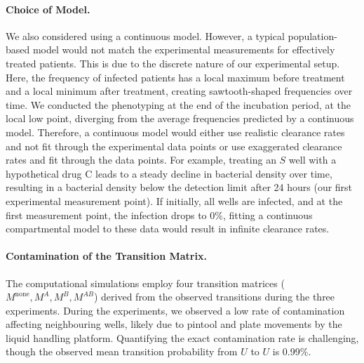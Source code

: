 \paragraph{Choice of Model.}
We also considered using a continuous model.
However, a typical population-based model would not match the experimental measurements for effectively treated patients.
This is due to the discrete nature of our experimental setup.
Here, the frequency of infected patients has a local maximum before treatment and a local minimum after treatment, creating sawtooth-shaped frequencies over time.
We conducted the phenotyping at the end of the incubation period, at the local low point, diverging from the average frequencies predicted by a continuous model.
Therefore, a continuous model would either use realistic clearance rates and not fit through the experimental data points or use exaggerated clearance rates and fit through the data points.
For example, treating an $S$ well with a hypothetical drug C leads to a steady decline in bacterial density over time, resulting in a bacterial density below the detection limit after 24 hours (our first experimental measurement point). 
If initially, all wells are infected, and at the first measurement point, the infection drops to 0\%, fitting a continuous compartmental model to these data would result in infinite clearance rates.

\paragraph{Contamination of the Transition Matrix. \label{par:contamination}}
The computational simulations employ four transition matrices  (\(M^\text{none}, M^{A}, M^{B}, M^{AB}\)) derived from the observed transitions during the three experiments. 
During the experiments, we observed a low rate of contamination affecting neighbouring wells, likely due to pintool and plate movements by the liquid handling platform. 
Quantifying the exact contamination rate is challenging, though the observed mean transition probability from \( U \) to \( U \) is 0.99\%.

